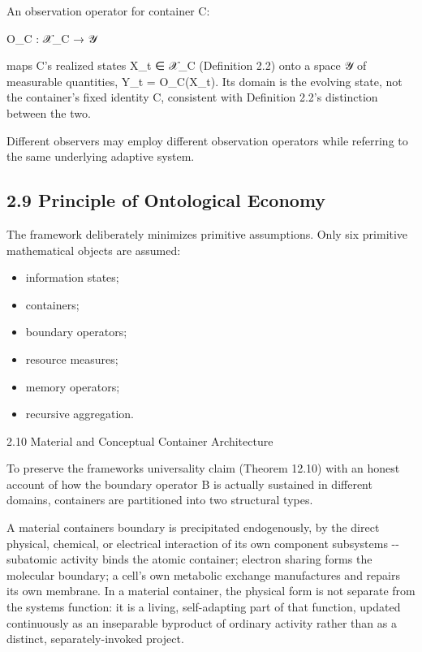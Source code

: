 \documentclass[
]{article}
\begin{document}
An observation operator for container C:

O\_C : 𝒳\_C → 𝒴

maps C's realized states X\_t ∈ 𝒳\_C (Definition 2.2) onto a space 𝒴 of
measurable quantities, Y\_t = O\_C(X\_t). Its domain is the evolving
state, not the container's fixed identity C, consistent with Definition
2.2's distinction between the two.

Different observers may employ different observation operators while
referring to the same underlying adaptive system.

\hypertarget{principle-of-ontological-economy}{%
\subsection{2.9 Principle of Ontological
Economy}\label{principle-of-ontological-economy}}

The framework deliberately minimizes primitive assumptions. Only six
primitive mathematical objects are assumed:

\begin{itemize}
\item
  information states;
\item
  containers;
\item
  boundary operators;
\item
  resource measures;
\item
  memory operators;
\item
  recursive aggregation.
\end{itemize}

2.10 Material and Conceptual Container Architecture

To preserve the frameworks universality claim (Theorem 12.10) with an
honest account of how the boundary operator B is actually sustained in
different domains, containers are partitioned into two structural types.

A material containers boundary is precipitated endogenously, by the
direct physical, chemical, or electrical interaction of its own
component subsystems -\/- subatomic activity binds the atomic container;
electron sharing forms the molecular boundary; a cell's own metabolic
exchange manufactures and repairs its own membrane. In a material
container, the physical form is not separate from the systems function:
it is a living, self-adapting part of that function, updated
continuously as an inseparable byproduct of ordinary activity rather
than as a distinct, separately-invoked project.
\end{document}
